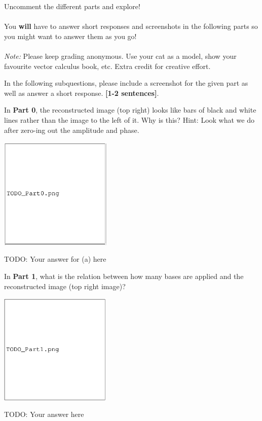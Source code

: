 \documentclass{csci1430}
\begin{document}
Uncomment the different parts and explore!
\\
\\
You \textbf{will} have to answer short responses and screenshots in the following parts so you might want to answer them as you go!
\\
\\
\emph{Note:} Please keep grading anonymous. Use your cat as a model, show your favourite vector calculus book, etc. Extra credit for creative effort.

\newpage

In the following subquestions, please include a screenshot for the given part as well as answer a short response. \textbf{[1-2 sentences]}.

\begin{subquestion}[points=2]
In \textbf{Part 0}, the reconstructed image (top right) looks like bars of black and white lines rather than the image to the left of it. Why is this? Hint: Look what we do after zero-ing out the amplitude and phase.
\end{subquestion}

\begin{answer}[height=15]
\includegraphics[width=0.4\textwidth,keepaspectratio]{images/TODO_Part0.png}

TODO: Your answer for (a) here
\end{answer}

\begin{subquestion}[points=2]
In \textbf{Part 1}, what is the relation between how many bases are applied and the reconstructed image (top right image)?
\end{subquestion}

\begin{answer}[height=15]
\includegraphics[width=0.4\textwidth,keepaspectratio]{images/TODO_Part1.png}

TODO: Your answer here
\end{answer}
\end{document}
